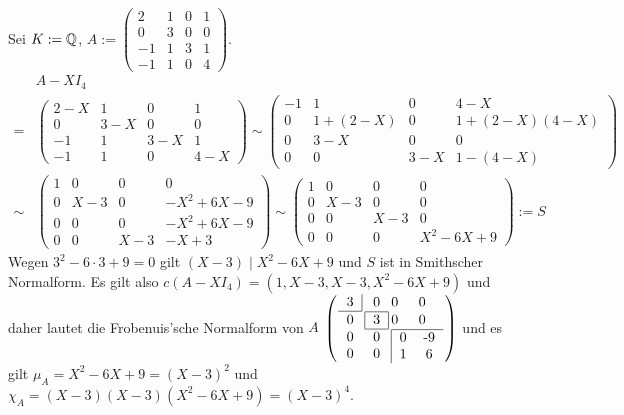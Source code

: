 \documentclass[../../main.tex]{subfiles}
\begin{document}
\begin{bsp}\label{17.5.6}
Sei $K:=\mathbb Q$, $A:=\begin{pmatrix}2&1&0&1\\0&3&0&0\\-1&1&3&1\\-1&1&0&4\end{pmatrix}$.
\begin{align*}
&A-XI_4\\
=&\begin{pmatrix}2-X&1&0&1\\0&3-X&0&0\\-1&1&3-X&1\\-1&1&0&4-X\end{pmatrix}\sim\begin{pmatrix}-1&1&0&4-X\\0&1+(2-X)&0&1+(2-X)(4-X)\\0&3-X&0&0\\0&0&3-X&1-(4-X)\end{pmatrix}\\
\sim&\begin{pmatrix}1&0&0&0\\0&X-3&0&-X^2+6X-9\\0&0&0&-X^2+6X-9\\0&0&X-3&-X+3\end{pmatrix}\sim\begin{pmatrix}1&0&0&0\\0&X-3&0&0\\0&0&X-3&0\\0&0&0&X^2-6X+9\end{pmatrix}:=S
\end{align*}
Wegen $3^2-6\cdot 3+9=0$ gilt $(X-3)\mid X^2-6X+9$ und $S$ ist in Smithscher Normalform. Es gilt also $c(A-XI_4)=(1,X-3,X-3,X^2-6X+9)$ und daher lautet die Frobenuis'sche Normalform von $A$ $\arraycolsep=1pt
\left(\begin{array}{c c c c}
\begin{tabular}{c|}3\\\hline\end{tabular}&0&0&0\\
0&\begin{tabular}{|c|}\hline 3\\\hline\end{tabular}&0&0\\
0&0&\multicolumn{2}{c}{\multirow{2}{*}{\begin{tabular}{|cc}
\hline 0&-9\\1&6\end{tabular}}}\\0&0
\end{array}\right)$ und es gilt $\mu_A=X^2-6X+9=(X-3)^2$ und $\chi_A=(X-3)(X-3)(X^2-6X+9)=(X-3)^4$.
\end{bsp}
\end{document}
